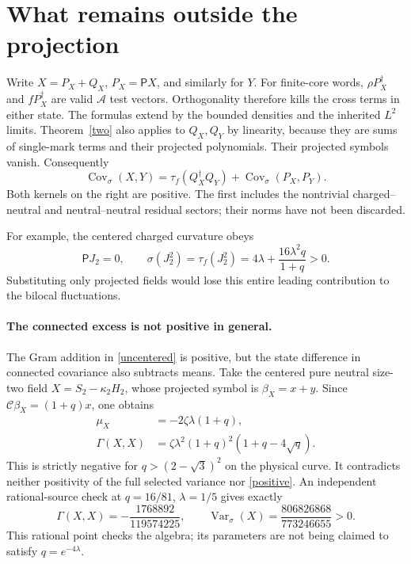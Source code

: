 \documentclass[11pt]{article}
\newcommand{\PP}{\mathsf P}
\begin{document}
\section{What remains outside the projection}
Write $X=P_X+Q_X$, $P_X=\PP X$, and similarly for $Y$.
For finite-core words, $\rho P_X^\dagger$ and
$fP_X^\dagger$ are valid $\mathcal A$ test vectors. Orthogonality
therefore kills the cross terms in either state. The formulas
extend by the bounded densities and the inherited $L^2$ limits.
Theorem~\ref{two} also applies to $Q_X,Q_Y$ by linearity,
because they are sums of single-mark terms and their projected
polynomials. Their projected symbols vanish. Consequently
\begin{equation}\label{positive}
 \operatorname{Cov}_{\sigma}(X,Y)=
 \tau_f(Q_X^\dagger Q_Y)
 +\operatorname{Cov}_{\sigma}(P_X,P_Y).
\end{equation}
Both kernels on the right are positive. The first includes the
nontrivial charged--neutral and neutral--neutral residual sectors;
their norms have not been discarded.

For example, the centered charged curvature obeys
\[
 \PP J_2=0,\qquad
 \sigma(J_2^2)=\tau_f(J_2^2)
       =4\lambda+\frac{16\lambda^2q}{1+q}>0.
\]
Substituting only projected fields would lose this entire
leading contribution to the bilocal fluctuations.

\paragraph{The connected excess is not positive in general.}
The Gram addition in \eqref{uncentered} is positive, but the
state difference in connected covariance also subtracts means.
Take the centered pure neutral size-two field
$X=S_2-\kappa_2H_2$, whose projected symbol is $\beta_X=x+y$.
Since $\mathcal C\beta_X=(1+q)x$, one obtains
\begin{align}
 \mu_X&=-2\zeta\lambda(1+q),\\
 \Gamma(X,X)&=\zeta\lambda^2(1+q)^2(1+q-4\sqrt q).
\end{align}
This is strictly negative for $q>(2-\sqrt3)^2$ on the physical
curve. It contradicts neither positivity of the full selected
variance nor \eqref{positive}. An independent rational-source
check at $q=16/81$, $\lambda=1/5$ gives exactly
\[
 \Gamma(X,X)=-\frac{1768892}{119574225},\qquad
 \operatorname{Var}_{\sigma}(X)=\frac{806826868}{773246655}>0.
\]
This rational point checks the algebra; its parameters are not
being claimed to satisfy $q=e^{-4\lambda}$.
\end{document}
